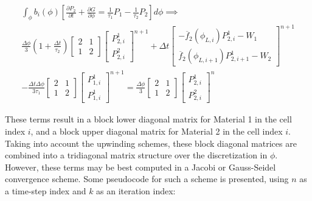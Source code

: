 \documentclass[12pt,a4paper,pagesize=pdftex]{scrartcl}
\begin{document}
\begin{multline*}
    \int_\phi b_i\left(\phi\right) \left[ \frac{\partial P_2}{\partial t} + \frac{\partial G}{\partial \phi} = \frac{1}{\tau_1} P_1 - \frac{1}{\tau_2} P_2\right] d\phi \implies \\
    \frac{\Delta \phi}{3}\left(1 + \frac{\Delta t}{\tau_2}\right)
    \begin{bmatrix}
        2 & 1 \\
        1 & 2
    \end{bmatrix}
    \begin{bmatrix}
        P^1_{2,i} \\
        P^2_{2,i}
    \end{bmatrix}^{n+1}
    + \Delta t
    \begin{bmatrix}
        - \overline{f}_2\left(\phi_{L,i}\right) P^1_{2,i} - W_1 \\
        \overline{f}_2\left(\phi_{L,i+1}\right) P^1_{2,i+1} - W_2
    \end{bmatrix}^{n+1} \\
    - \frac{\Delta t \Delta \phi}{3 \tau_1}
    \begin{bmatrix}
        2 & 1 \\
        1 & 2
    \end{bmatrix}
    \begin{bmatrix}
        P_{1,i}^1 \\
        P_{1,i}^1
    \end{bmatrix}^{n+1}
    = \frac{\Delta \phi}{3}
    \begin{bmatrix}
        2 & 1 \\
        1 & 2
    \end{bmatrix}
    \begin{bmatrix}
        P_{2,i}^1 \\
        P_{2,i}^2
    \end{bmatrix}^n
\end{multline*}

These terms result in a block lower diagonal matrix for Material 1 in the cell index \(i\), and a block upper diagonal matrix for Material 2 in the cell index \(i\). Taking into account the upwinding schemes, these block diagonal matrices are combined into a tridiagonal matrix structure over the discretization in \(\phi\). However, these terms may be best computed in a Jacobi or Gauss-Seidel convergence scheme. Some pseudocode for such a scheme is presented, using \(n\) as a time-step index and \(k\) as an iteration index:
\end{document}
